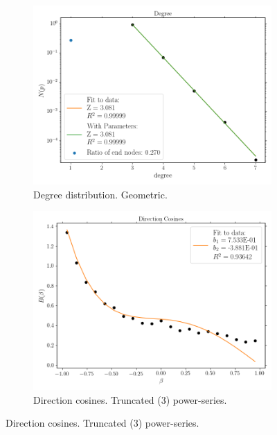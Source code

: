 \begin{figure}[H]
  \centering
  \begin{subfigure}{0.5\textwidth}
    \centering
    \includegraphics[width=0.99\linewidth]{Figures/chapter-image/pipeline_screenshots/actin_degree_tile4_c_m.png}
    \caption{Degree distribution. Geometric.}
    \label{subfig:actin_degree}
  \end{subfigure}%
  \begin{subfigure}{0.5\textwidth}
    \centering
    \includegraphics[width=0.99\linewidth]{Figures/chapter-image/pipeline_screenshots/actin_cosines_tile4_c_m_iPA_iShort1_bins21.png}
    \caption{Direction cosines. Truncated (3) power-series.}

\end{subfigure}
\end{figure}
